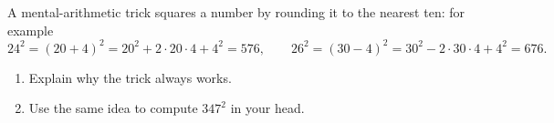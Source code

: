 A mental-arithmetic trick squares a number by rounding it to the nearest ten: for example
\[24^2=(20+4)^2=20^2+2\cdot20\cdot4+4^2=576,\qquad26^2=(30-4)^2=30^2-2\cdot30\cdot4+4^2=676.\]
\begin{enumerate}
\item[(a)] Explain why the trick always works.
\item[(b)] Use the same idea to compute $347^2$ in your head.
\end{enumerate}

